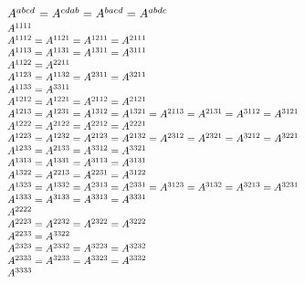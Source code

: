 \begin{otherlanguage}{russian}
\nopagebreak\vspace{-0.25em}\begin{equation*}\scalebox{0.8}{$\begin{array}{l}
\scalebox{1.16}{$A^{abcd^{\mathstrut}} = A^{cdab} = A^{bacd} = A^{abdc}$} \\[0.2em]
%
A^{1111} \\
A^{1112} = A^{1121} = A^{1211} = A^{2111} \\
A^{1113} = A^{1131} = A^{1311} = A^{3111} \\
A^{1122} = A^{2211} \\
A^{1123} = A^{1132} = A^{2311} = A^{3211} \\
A^{1133} = A^{3311} \\
A^{1212} = A^{1221} = A^{2112} = A^{2121} \\
A^{1213} = A^{1231} = A^{1312} = A^{1321} = A^{2113} = A^{2131} = A^{3112} = A^{3121} \\
A^{1222} = A^{2122} = A^{2212} = A^{2221} \\
A^{1223} = A^{1232} = A^{2123} = A^{2132} = A^{2312} = A^{2321} = A^{3212} = A^{3221} \\
A^{1233} = A^{2133} = A^{3312} = A^{3321} \\
A^{1313} = A^{1331} = A^{3113} = A^{3131} \\
A^{1322} = A^{2213} = A^{2231} = A^{3122} \\
A^{1323} = A^{1332} = A^{2313} = A^{2331} = A^{3123} = A^{3132} = A^{3213} = A^{3231} \\
A^{1333} = A^{3133} = A^{3313} = A^{3331} \\
A^{2222} \\
A^{2223} = A^{2232} = A^{2322} = A^{3222} \\
A^{2233} = A^{3322} \\
A^{2323} = A^{2332} = A^{3223} = A^{3232} \\
A^{2333} = A^{3233} = A^{3323} = A^{3332} \\
A^{3333} \\
\end{array}$}
\end{equation*}


\end{otherlanguage}
